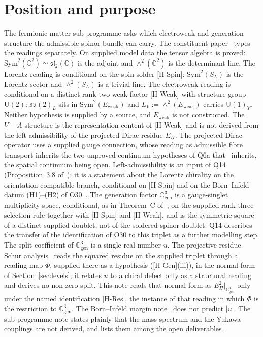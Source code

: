 \documentclass[11pt]{article}
\theoremstyle{definition}
\theoremstyle{remark}
\newcommand{\Cgen}{\mathbb{C}^{3}_{\mathrm{gen}}}
\newcommand{\Epi}{E_{\Pi}}
\newcommand{\SW}{S_{L}}
\newcommand{\Ew}{E_{\mathrm{weak}}}
\newcommand{\LY}{L_{Y}}
\newcommand{\Sym}{\mathrm{Sym}}
\newcommand{\UU}{\mathrm{U}}
\begin{document}
  \newpage

  \tableofcontents

  \newpage

  \section{Position and purpose}
    \label{sec:position}

    The fermionic-matter sub-programme asks which electroweak and generation structure the admissible spinor bundle can
    carry.
    The constituent paper~\cite{Beau2026q14} types the readings separately.
    On supplied model data the tensor algebra is proved: $\Sym^{2}(\mathbb{C}^{2}) \simeq \mathfrak{sl}_{2}(\mathbb{C})$
    is the adjoint and $\wedge^{2}(\mathbb{C}^{2})$ is the determinant line.
    The Lorentz reading is conditional on the spin solder [H-Spin]: $\Sym^{2}(\SW)$ is the Lorentz sector and
    $\wedge^{2}(\SW)$ is a trivial line.
    The electroweak reading is conditional on a distinct rank-two weak factor [H-Weak] with structure group $\UU(2)$:
    $\mathfrak{su}(2)_{L}$ sits in $\Sym^{2}(\Ew)$ and $\LY := \wedge^{2}(\Ew)$ carries $\UU(1)_{Y}$.
    Neither hypothesis is supplied by a source, and $\Ew$ is not constructed.
    The $V-A$ structure is the representation content of [H-Weak] and is not derived from the left-admissibility of the
    projected Dirac residue $\Epi$.
    The projected Dirac operator uses a supplied gauge connection, whose reading as admissible fibre transport inherits
    the two unproved continuum hypotheses of Q6a that~\cite{Beau2026q14} inherits, the spatial continuum being open.
    Left-admissibility is an input of Q14 (Proposition~3.8 of~\cite{Beau2026q14}): it is a statement about the Lorentz
    chirality on the orientation-compatible branch, conditional on [H-Spin] and on the Born--Infeld datum (H1)--(H2) of
    O30~\cite{Beau2026a34}.
    The generation factor $\Cgen$ is a gauge-singlet multiplicity space, conditional, as in Theorem~C
    of~\cite{Beau2026q14}, on the supplied rank-three selection rule together with [H-Spin] and [H-Weak], and is the symmetric square of a distinct supplied doublet, not of the soldered spinor doublet.
    Q14 describes the transfer of the identification of O30 to this triplet as a further modelling step.
    The split coefficient of $\Cgen$ is a single real number $u$.
    The projective-residue Schur analysis~\cite{Beau2026prs} reads the squared residue on the supplied triplet through
    a reading map $\Phi$, supplied there as a hypothesis ([H-Gen](iii)), in the normal form of
    Section~\ref{sec:levels}; it relates $u$ to a chiral defect only as a structural reading and derives no non-zero
    split.
    This note reads that normal form as $\Epi^{2}|_{\Cgen}$ only under the named identification [H-Res], the
    instance of that reading in which $\Phi$ is the restriction to $\Cgen$.
    The Born--Infeld margin note~\cite{Beau2026bim} does not predict $|u|$.
    The sub-programme note states plainly that the mass spectrum and the Yukawa couplings are not derived, and lists
    them among the open deliverables~\cite{Beau2026fmnote}.
\end{document}
